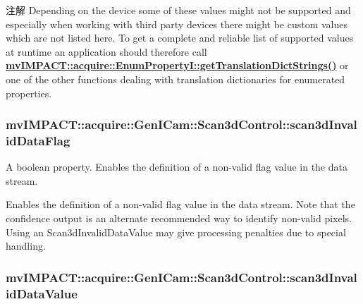 \begin{DoxyNote}{注解}
Depending on the device some of these values might not be supported and especially when working with third party devices there might be custom values which are not listed here. To get a complete and reliable list of supported values at runtime an application should therefore call {\bfseries \hyperlink{classmv_i_m_p_a_c_t_1_1acquire_1_1_enum_property_i_a0ba6ccbf5ee69784d5d0b537924d26b6}{mv\+I\+M\+P\+A\+C\+T\+::acquire\+::\+Enum\+Property\+I\+::get\+Translation\+Dict\+Strings()}} or one of the other functions dealing with translation dictionaries for enumerated properties. 
\end{DoxyNote}
\hypertarget{classmv_i_m_p_a_c_t_1_1acquire_1_1_gen_i_cam_1_1_scan3d_control_a4f7140afe110debf04ca3ef728123a93}{
\subsubsection[{scan3d\+Invalid\+Data\+Flag}]{ mv\+I\+M\+P\+A\+C\+T\+::acquire\+::\+Gen\+I\+Cam\+::\+Scan3d\+Control\+::scan3d\+Invalid\+Data\+Flag}}\label{classmv_i_m_p_a_c_t_1_1acquire_1_1_gen_i_cam_1_1_scan3d_control_a4f7140afe110debf04ca3ef728123a93}


A boolean property. Enables the definition of a non-\/valid flag value in the data stream. 

Enables the definition of a non-\/valid flag value in the data stream. Note that the confidence output is an alternate recommended way to identify non-\/valid pixels. Using an Scan3d\+Invalid\+Data\+Value may give processing penalties due to special handling. \hypertarget{classmv_i_m_p_a_c_t_1_1acquire_1_1_gen_i_cam_1_1_scan3d_control_a5df5e46758c323e9c11aa39fb966cda4}{
\subsubsection[{scan3d\+Invalid\+Data\+Value}]{ mv\+I\+M\+P\+A\+C\+T\+::acquire\+::\+Gen\+I\+Cam\+::\+Scan3d\+Control\+::scan3d\+Invalid\+Data\+Value}}\label{classmv_i_m_p_a_c_t_1_1acquire_1_1_gen_i_cam_1_1_scan3d_control_a5df5e46758c323e9c11aa39fb966cda4}


